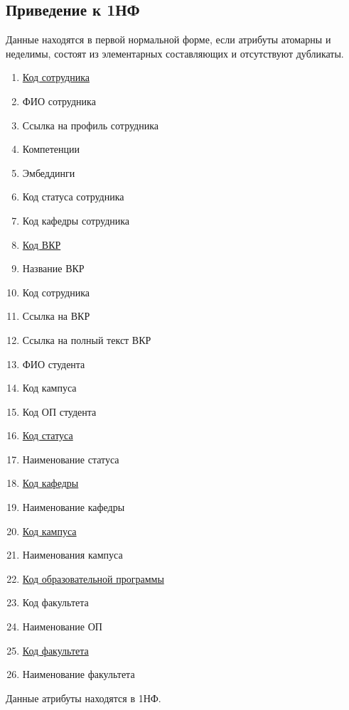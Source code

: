 \documentclass[PI,KR]{HSEUniversity}
\begin{document}
\subsection{Приведение к 1НФ}
Данные находятся в первой нормальной форме, если атрибуты атомарны и неделимы, состоят из элементарных составляющих и отсутствуют дубликаты.
\begin{enumerate}
	\item \underline{Код сотрудника}
	\item ФИО сотрудника
	\item Ссылка на профиль сотрудника
	\item Компетенции
	\item Эмбеддинги
	\item Код статуса сотрудника
	\item Код кафедры сотрудника
		
	\item \underline{Код ВКР}
	\item Название ВКР
	\item Код сотрудника
	\item Ссылка на ВКР
	\item Ссылка на полный текст ВКР
	\item ФИО студента
	\item Код кампуса
	\item Код ОП студента
	
	\item \underline{Код статуса}
	\item Наименование статуса
	
	\item \underline{Код кафедры}
	\item Наименование кафедры
	
	\item \underline{Код кампуса}
	\item Наименования кампуса
	
	\item \underline{Код образовательной программы}
	\item Код факультета
	\item Наименование ОП
	
	\item \underline{Код факультета}
	\item Наименование факультета
\end{enumerate} 

Данные атрибуты находятся в 1НФ.
\end{document}

